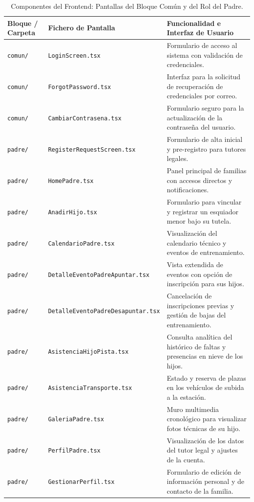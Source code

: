         \begin{table}[htbp]
        \centering
        \scriptsize
        \renewcommand{\arraystretch}{0.95}
        \begin{tabularx}{\textwidth}{|l|l|X|}
        \hline
        \rowcolor[HTML]{EFEFEF} 
        \textbf{Bloque / Carpeta} & \textbf{Fichero de Pantalla} & \textbf{Funcionalidad e Interfaz de Usuario} \\ \hline
        \texttt{comun/} & \texttt{LoginScreen.tsx} & Formulario de acceso al sistema con validación de credenciales. \\ \hline
        \texttt{comun/} & \texttt{ForgotPassword.tsx} & Interfaz para la solicitud de recuperación de credenciales por correo. \\ \hline
        \texttt{comun/} & \texttt{CambiarContrasena.tsx} & Formulario seguro para la actualización de la contraseña del usuario. \\ \hline
        \texttt{padre/} & \texttt{RegisterRequestScreen.tsx} & Formulario de alta inicial y pre-registro para tutores legales. \\ \hline
        \texttt{padre/} & \texttt{HomePadre.tsx} & Panel principal de familias con accesos directos y notificaciones. \\ \hline
        \texttt{padre/} & \texttt{AnadirHijo.tsx} & Formulario para vincular y registrar un esquiador menor bajo su tutela. \\ \hline
        \texttt{padre/} & \texttt{CalendarioPadre.tsx} & Visualización del calendario técnico y eventos de entrenamiento. \\ \hline
        \texttt{padre/} & \texttt{DetalleEventoPadreApuntar.tsx} & Vista extendida de eventos con opción de inscripción para sus hijos. \\ \hline
        \texttt{padre/} & \texttt{DetalleEventoPadreDesapuntar.tsx} & Cancelación de inscripciones previas y gestión de bajas del entrenamiento. \\ \hline
        \texttt{padre/} & \texttt{AsistenciaHijoPista.tsx} & Consulta analítica del histórico de faltas y presencias en nieve de los hijos. \\ \hline
        \texttt{padre/} & \texttt{AsistenciaTransporte.tsx} & Estado y reserva de plazas en los vehículos de subida a la estación. \\ \hline
        \texttt{padre/} & \texttt{GaleriaPadre.tsx} & Muro multimedia cronológico para visualizar fotos técnicas de su hijo. \\ \hline
        \texttt{padre/} & \texttt{PerfilPadre.tsx} & Visualización de los datos del tutor legal y ajustes de la cuenta. \\ \hline
        \texttt{padre/} & \texttt{GestionarPerfil.tsx} & Formulario de edición de información personal y de contacto de la familia. \\ \hline
        \end{tabularx}
        \caption{Componentes del Frontend: Pantallas del Bloque Común y del Rol del Padre.}
        \label{tab:frontend_screens_1}
        \end{table}

